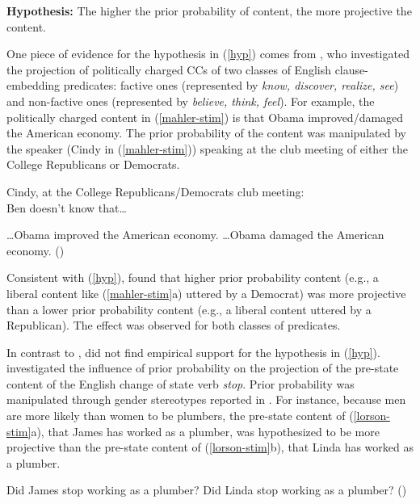 \documentclass[11pt,fleqn]{article}
\newcommand{\6}{\mbox{$[\hspace*{-.6mm}[$}}
\newcommand{\9}{\mbox{$]\hspace*{-.6mm}]$}}
\begin{document}
\begin{exe}
\ex\label{hyp} {\bf Hypothesis:} The higher the prior probability of content, the more projective the content.
\end{exe}

One piece of evidence for the hypothesis in (\ref{hyp}) comes from \citet{mahler2020}, who investigated the projection of politically charged CCs of two classes of English clause-embedding predicates: factive ones (represented by {\em know, discover, realize, see}) and non-factive ones (represented by {\em believe, think, feel}). For example, the politically charged content in (\ref{mahler-stim}) is that Obama improved/damaged the American economy. The prior probability of the content was manipulated by the speaker (Cindy in (\ref{mahler-stim})) speaking at the club meeting of either the College Republicans or Democrats.

\begin{exe}
\ex\label{mahler-stim} Cindy, at the College Republicans/Democrats club meeting: \\ Ben doesn't know that\ldots
\begin{xlist}
\ex \ldots Obama improved the American economy.
\ex \ldots Obama damaged the American economy. \hfill (\citealt[784f.]{mahler2020})
\end{xlist}
\end{exe}
Consistent with (\ref{hyp}), \citet{mahler2020} found that higher prior probability content (e.g., a liberal content like (\ref{mahler-stim}a) uttered by a Democrat) was more projective than a lower prior probability content (e.g., a liberal content uttered by a Republican). The effect was observed for both classes of predicates.

In contrast to \citealt{mahler2020}, \citealt{lorson2018} did not find empirical support for the hypothesis in (\ref{hyp}). \citet{lorson2018} investigated the influence of prior probability on the projection of the pre-state content of the English change of state verb {\em stop}. Prior probability was manipulated through gender stereotypes reported in \citealt{boyce-etal2018}. For instance, because men are more likely than women to be plumbers, the pre-state content of (\ref{lorson-stim}a), that James has worked as a plumber, was hypothesized to be more projective than the pre-state content of (\ref{lorson-stim}b), that Linda has worked as a plumber.

\begin{exe}
\ex\label{lorson-stim} 
\begin{xlist}
\ex Did James stop working as a plumber?
\ex Did Linda stop working as a plumber? \hfill (\citealt[38]{lorson2018})
\end{xlist}
\end{exe}
\end{document}
